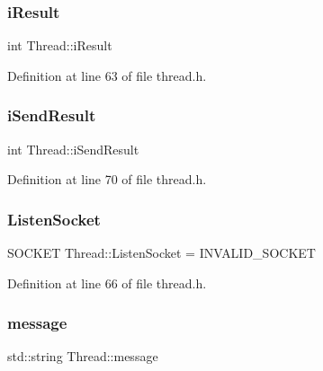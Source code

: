 \subsubsection{\texorpdfstring{i\+Result}{iResult}}
{\footnotesize\ttfamily int Thread\+::i\+Result\hspace{0.3cm}{\ttfamily [private]}}



Definition at line 63 of file thread.\+h.

\mbox{\label{class_thread_aaab7b602b708cc86645e9d0e37790fa8}} 
\subsubsection{\texorpdfstring{i\+Send\+Result}{iSendResult}}
{\footnotesize\ttfamily int Thread\+::i\+Send\+Result\hspace{0.3cm}{\ttfamily [private]}}



Definition at line 70 of file thread.\+h.

\mbox{\label{class_thread_a97ba65f7258f257c2098a134b09ec0c5}} 
\subsubsection{\texorpdfstring{Listen\+Socket}{ListenSocket}}
{\footnotesize\ttfamily S\+O\+C\+K\+ET Thread\+::\+Listen\+Socket = I\+N\+V\+A\+L\+I\+D\+\_\+\+S\+O\+C\+K\+ET\hspace{0.3cm}{\ttfamily [private]}}



Definition at line 66 of file thread.\+h.

\mbox{\label{class_thread_afed0854962aaacec661b4e746c28e13d}} 
\subsubsection{\texorpdfstring{message}{message}}
{\footnotesize\ttfamily std\+::string Thread\+::message\hspace{0.3cm}{\ttfamily [private]}}



